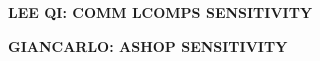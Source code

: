 \documentclass[11pt,
  english,
  a4paper,
]{article}
\begin{document}

\textbf{LEE QI: COMM LCOMPS SENSITIVITY}

\leavevmode\tagmcend\tagstructend\par


\textbf{GIANCARLO: ASHOP SENSITIVITY}

\leavevmode\tagmcend\tagstructend\par

\end{document}
